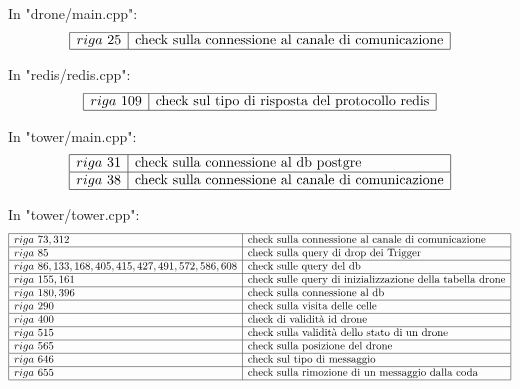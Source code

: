 \documentclass[a4paper, 11pt]{article}
\begin{document}
In "drone/main.cpp":
\[\begin{array}{|l|l|}
    \hline
    riga\ 25 & \text{check sulla connessione al canale di comunicazione}\\
    \hline
\end{array}\]

In "redis/redis.cpp":
\[\begin{array}{|l|l|}
    \hline
    riga\ 109& \text{check sul tipo di risposta del protocollo redis}\\
    \hline
\end{array}\]

In "tower/main.cpp":
\[\begin{array}{|l|l|}
    \hline
    riga\ 31 &\text{check sulla connessione al db postgre}\\
    \hline
    riga\ 38 & \text{check sulla connessione al canale di comunicazione}\\
\hline
\end{array}\]

In "tower/tower.cpp":
\[\begin{array}{|l|l|}
    \hline
    riga\ 73,312 & \text{check sulla connessione al canale di comunicazione}\\
    \hline
    riga\ 85 & \text{check sulla query di drop dei Trigger}\\
    \hline
    riga\ 86,133,168,405,415,427,491,572,586,608 & \text{check sulle query del db}\\
    \hline
    riga\ 155,161 & \text{check sulle query di inizializzazione della tabella drone}\\
    \hline
    riga\ 180,396 & \text{check sulla connessione al db}\\
    \hline
    riga\ 290 & \text{check sulla visita delle celle}\\
    \hline
    riga\ 400 & \text{check di validità id drone}\\
    \hline
    riga\ 515 & \text{check sulla validità dello stato di un drone}\\
    \hline
    riga\ 565 &\text{check sulla posizione del drone}\\
    \hline
    riga\ 646 & \text{check sul tipo di messaggio}\\
    \hline
    riga\ 655 & \text{check sulla rimozione di un messaggio dalla coda}\\
    \hline
\end{array}\]
\newpage
\end{document}
